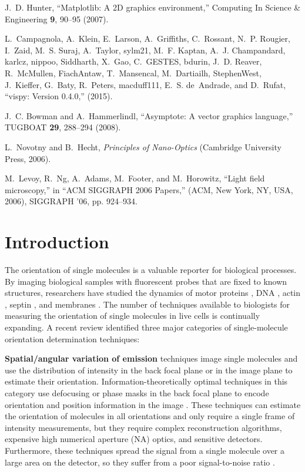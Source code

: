 \documentclass[10pt]{article}
\begin{document}
\begin{thebibliography}{10}
J.~D. Hunter, \enquote{Matplotlib: A {2D} graphics environment,} Computing In
  Science \& Engineering \textbf{9}, 90--95 (2007).

L.~Campagnola, A.~Klein, E.~Larson, A.~Griffiths, C.~Rossant, N.~P. Rougier,
  I.~Zaid, M.~S. Suraj, A.~Taylor, sylm21, M.~F. Kaptan, A.~J. Champandard,
  karlcz, nippoo, Siddharth, X.~Gao, C.~GESTES, bdurin, J.~D. Reaver,
  R.~McMullen, FiachAntaw, T.~Mansencal, M.~Dartiailh, StephenWest, J.~Kieffer,
  G.~Baty, R.~Peters, macduff111, E.~S. de~Andrade, and D.~Rufat,
  \enquote{vispy: Version 0.4.0,}  (2015).

J.~C. Bowman and A.~Hammerlindl, \enquote{Asymptote: A vector graphics
  language,} TUGBOAT \textbf{29}, 288--294 (2008).

L.~Novotny and B.~Hecht, \emph{Principles of Nano-Optics} (Cambridge University
  Press, 2006).

M.~Levoy, R.~Ng, A.~Adams, M.~Footer, and M.~Horowitz, \enquote{Light field
  microscopy,} in \enquote{ACM SIGGRAPH 2006 Papers,}  (ACM, New York, NY, USA,
  2006), SIGGRAPH '06, pp. 924--934.

\end{thebibliography}


\section{Introduction}
The orientation of single molecules is a valuable reporter for
biological processes. By imaging biological samples with fluorescent probes that
are fixed to known structures, researchers have studied the dynamics of motor
proteins \cite{peterman2001, forkey2003}, DNA \cite{backer2016}, actin
\cite{mehta2016}, septin \cite{demay2011, mcquilken2017}, and membranes
\cite{anantharam2010}. The number of techniques available to biologists for
measuring the orientation of single molecules in live cells is continually
expanding. A recent review \cite{backlund2014} identified three major categories
of single-molecule orientation determination techniques:

\textbf{Spatial/angular variation of emission} techniques image single molecules
and use the distribution of intensity in the back focal plane \cite{lieb2004} or
in the image plane \cite{backer2014} to estimate their
orientation. Information-theoretically optimal techniques in this category use
defocusing or phase masks in the back focal plane to encode orientation and
position information in the image \cite{agrawal2012}. These techniques can
estimate the orientation of molecules in all orientations and only require a
single frame of intensity measurements, but they require complex reconstruction
algorithms, expensive high numerical aperture (NA) optics, and sensitive
detectors. Furthermore, these techniques spread the signal from a single
molecule over a large area on the detector, so they suffer from a poor
signal-to-noise ratio \cite{toprak2006}.
\end{document}
